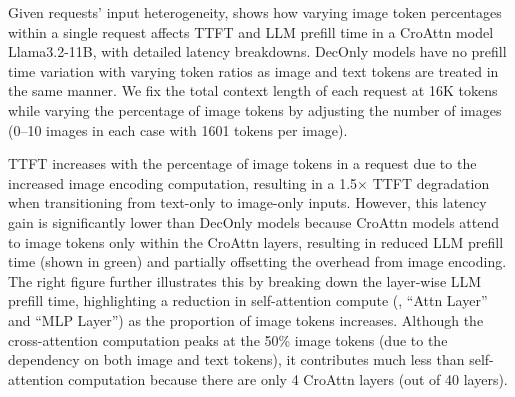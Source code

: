 Given \lmm{} requests' input heterogeneity,  shows how varying image token percentages within a single request affects TTFT and LLM prefill time in a CroAttn model Llama3.2-11B, with detailed latency breakdowns.
DecOnly models have no prefill time variation with varying token ratios as image and text tokens are treated in the same manner.
We fix the total context length of each request at 16K tokens while varying the percentage of image tokens by adjusting the number of images (0--10 images in each case with 1601 tokens per image).



TTFT increases with the percentage of image tokens in a request due to the increased image encoding computation, resulting in a 1.5$\times$ TTFT degradation when transitioning from text-only to image-only inputs.
However, this latency gain is significantly lower than DecOnly models because CroAttn models attend to image tokens only within the CroAttn layers, resulting in reduced LLM prefill time (shown in green) and partially offsetting the overhead from image encoding.
The right figure further illustrates this by breaking down the layer-wise LLM prefill time, highlighting a reduction in self-attention compute (\ie{}, ``Attn Layer'' and ``MLP Layer'') as the proportion of image tokens increases.
Although the cross-attention computation peaks at the 50\% image tokens (due to the dependency on both image and text tokens), it contributes much less than self-attention computation because there are only 4 CroAttn layers (out of 40 layers).

\label{insight:7}
